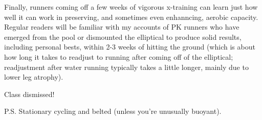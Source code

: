 Finally, runners coming off a few weeks of vigorous x-training can learn just how well it can work in preserving, and sometimes even enhanncing, aerobic capacity. Regular readers will be familiar with my accounts of PK runners who have emerged from the pool or dismounted the elliptical to produce solid results, including personal bests, within 2-3 weeks of hitting the ground (which is about how long it takes to readjust to running after coming off of the elliptical; readjustment after water running typically takes a little longer, mainly due to lower leg atrophy).

\bigskip

Class dismissed!

\bigskip

P.S. Stationary cycling and belted (unless you're unusually buoyant).

